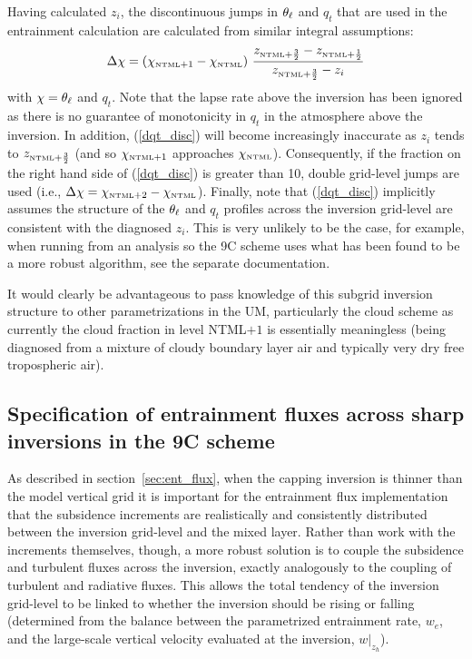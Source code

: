 \documentclass{UMDP_article}
\begin{document}
Having calculated $z_i$, the discontinuous jumps in $\theta_{\ell}$ and
$q_t$ that are used in the entrainment calculation are calculated from
similar integral assumptions:
\begin{equation}
  \Delta \chi = \left( {\chi}_{\mbox{\tiny \rm NTML}+1} - {\chi}_{\mbox{\tiny \rm NTML}} \right) \,
  \frac{ z_{\mbox{\tiny \rm NTML}+\frac{3}{2}} - z_{\mbox{\tiny \rm NTML}+\frac{1}{2}} }
  { z_{\mbox{\tiny \rm NTML}+\frac{3}{2}} - z_i }
\label{dqt_disc}
\end{equation}
with $\chi = \theta_{\ell}$ and $q_t$.  Note that the lapse rate above the
inversion has been ignored as there is no guarantee of monotonicity in
$q_t$ in the atmosphere above the inversion.  In addition,
(\ref{dqt_disc}) will become increasingly inaccurate as $z_i$ tends to
$z_{\mbox{\tiny \rm NTML}+\frac{3}{2}}$ (and so ${\chi}_{\mbox{\tiny \rm NTML}+1}$ approaches
${\chi}_{\mbox{\tiny \rm NTML}}$).  Consequently, if the fraction on the right hand
side of (\ref{dqt_disc}) is greater than 10, double grid-level jumps
are used (\mbox{i.e.}, $\Delta \chi = {\chi}_{\mbox{\tiny \rm NTML}+2} -
{\chi}_{\mbox{\tiny \rm NTML}} $).  Finally, note that (\ref{dqt_disc}) implicitly
assumes the structure of the $\theta_{\ell}$ and $q_t$ profiles across the
inversion grid-level are consistent with the diagnosed $z_i$.  This is
very unlikely to be the case, for example, when running from an
analysis so the 9C scheme uses what has been found to be a more robust
algorithm, see the separate documentation.

It would clearly be advantageous to pass knowledge of this subgrid
inversion structure to other parametrizations in the UM, particularly
the cloud scheme as currently the cloud fraction in level NTML$+1$ is
essentially meaningless (being diagnosed from a mixture of cloudy
boundary layer air and typically very dry free tropospheric air).

\subsection{Specification of entrainment fluxes across sharp inversions in the 9C scheme}
\label{sec:ent_flux_9c}

As described in section~\ref{sec:ent_flux}, when the capping inversion
is thinner than the model vertical grid it is important for the
entrainment flux implementation that the subsidence increments are
realistically and consistently distributed between the inversion
grid-level and the mixed layer.  Rather than work with the increments
themselves, though, a more robust solution is to couple the subsidence
and turbulent fluxes across the inversion, exactly analogously to the
coupling of turbulent and radiative fluxes.  This allows the total
tendency of the inversion grid-level to be linked to whether the
inversion should be rising or falling (determined from the balance
between the parametrized entrainment rate, $w_e$, and the large-scale
vertical velocity evaluated at the inversion, $w|_{z_h}$).
\end{document}
